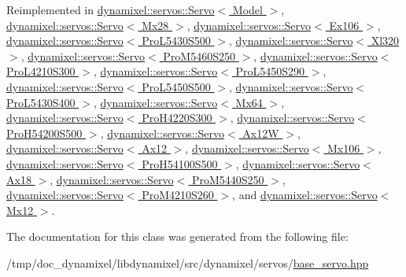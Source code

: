 Reimplemented in \hyperlink{classdynamixel_1_1servos_1_1_servo_a35e4d514a5a87ae20c80e36b95a7a894}{dynamixel\+::servos\+::\+Servo$<$ Model $>$}, \hyperlink{classdynamixel_1_1servos_1_1_servo_a35e4d514a5a87ae20c80e36b95a7a894}{dynamixel\+::servos\+::\+Servo$<$ Mx28 $>$}, \hyperlink{classdynamixel_1_1servos_1_1_servo_a35e4d514a5a87ae20c80e36b95a7a894}{dynamixel\+::servos\+::\+Servo$<$ Ex106 $>$}, \hyperlink{classdynamixel_1_1servos_1_1_servo_a35e4d514a5a87ae20c80e36b95a7a894}{dynamixel\+::servos\+::\+Servo$<$ Pro\+L5430\+S500 $>$}, \hyperlink{classdynamixel_1_1servos_1_1_servo_a35e4d514a5a87ae20c80e36b95a7a894}{dynamixel\+::servos\+::\+Servo$<$ Xl320 $>$}, \hyperlink{classdynamixel_1_1servos_1_1_servo_a35e4d514a5a87ae20c80e36b95a7a894}{dynamixel\+::servos\+::\+Servo$<$ Pro\+M5460\+S250 $>$}, \hyperlink{classdynamixel_1_1servos_1_1_servo_a35e4d514a5a87ae20c80e36b95a7a894}{dynamixel\+::servos\+::\+Servo$<$ Pro\+L4210\+S300 $>$}, \hyperlink{classdynamixel_1_1servos_1_1_servo_a35e4d514a5a87ae20c80e36b95a7a894}{dynamixel\+::servos\+::\+Servo$<$ Pro\+L5450\+S290 $>$}, \hyperlink{classdynamixel_1_1servos_1_1_servo_a35e4d514a5a87ae20c80e36b95a7a894}{dynamixel\+::servos\+::\+Servo$<$ Pro\+L5450\+S500 $>$}, \hyperlink{classdynamixel_1_1servos_1_1_servo_a35e4d514a5a87ae20c80e36b95a7a894}{dynamixel\+::servos\+::\+Servo$<$ Pro\+L5430\+S400 $>$}, \hyperlink{classdynamixel_1_1servos_1_1_servo_a35e4d514a5a87ae20c80e36b95a7a894}{dynamixel\+::servos\+::\+Servo$<$ Mx64 $>$}, \hyperlink{classdynamixel_1_1servos_1_1_servo_a35e4d514a5a87ae20c80e36b95a7a894}{dynamixel\+::servos\+::\+Servo$<$ Pro\+H4220\+S300 $>$}, \hyperlink{classdynamixel_1_1servos_1_1_servo_a35e4d514a5a87ae20c80e36b95a7a894}{dynamixel\+::servos\+::\+Servo$<$ Pro\+H54200\+S500 $>$}, \hyperlink{classdynamixel_1_1servos_1_1_servo_a35e4d514a5a87ae20c80e36b95a7a894}{dynamixel\+::servos\+::\+Servo$<$ Ax12\+W $>$}, \hyperlink{classdynamixel_1_1servos_1_1_servo_a35e4d514a5a87ae20c80e36b95a7a894}{dynamixel\+::servos\+::\+Servo$<$ Ax12 $>$}, \hyperlink{classdynamixel_1_1servos_1_1_servo_a35e4d514a5a87ae20c80e36b95a7a894}{dynamixel\+::servos\+::\+Servo$<$ Mx106 $>$}, \hyperlink{classdynamixel_1_1servos_1_1_servo_a35e4d514a5a87ae20c80e36b95a7a894}{dynamixel\+::servos\+::\+Servo$<$ Pro\+H54100\+S500 $>$}, \hyperlink{classdynamixel_1_1servos_1_1_servo_a35e4d514a5a87ae20c80e36b95a7a894}{dynamixel\+::servos\+::\+Servo$<$ Ax18 $>$}, \hyperlink{classdynamixel_1_1servos_1_1_servo_a35e4d514a5a87ae20c80e36b95a7a894}{dynamixel\+::servos\+::\+Servo$<$ Pro\+M5440\+S250 $>$}, \hyperlink{classdynamixel_1_1servos_1_1_servo_a35e4d514a5a87ae20c80e36b95a7a894}{dynamixel\+::servos\+::\+Servo$<$ Pro\+M4210\+S260 $>$}, and \hyperlink{classdynamixel_1_1servos_1_1_servo_a35e4d514a5a87ae20c80e36b95a7a894}{dynamixel\+::servos\+::\+Servo$<$ Mx12 $>$}.



The documentation for this class was generated from the following file\+:\begin{DoxyCompactItemize}
\item 
/tmp/doc\+\_\+dynamixel/libdynamixel/src/dynamixel/servos/\hyperlink{base__servo_8hpp}{base\+\_\+servo.\+hpp}\end{DoxyCompactItemize}
